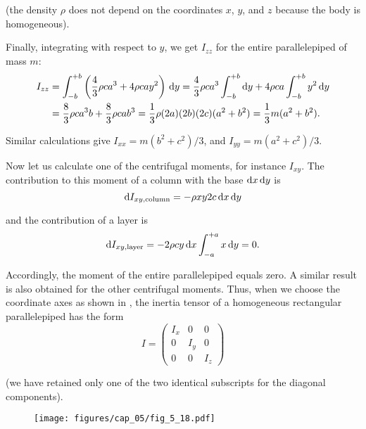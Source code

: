 \noindent
(the density $\rho$ does not depend on the coordinates $x$, $y$, and $z$ because the body is homogeneous).

Finally, integrating  with respect to $y$, we get $I_{zz}$ for the entire parallelepiped of mass $m$:
\begin{align*}
I_{zz} &= \int_{-b}^{+b} \left(\frac{4}{3}\rho ca^3+4\rho cay^2\right)\,\mathrm{d} y = \frac{4}{3}\rho ca^3 \int_{-b}^{+b}\mathrm{d} y + 4\rho ca \int_{-b}^{+b} y^2 \,\mathrm{d} y\\
&= \frac{8}{3}\rho ca^3b + \frac{8}{3}\rho cab^3 = \frac{1}{3} \rho (2a)(2b)(2c)(a^2+b^2) = \frac{1}{3}m(a^2+b^2).
\end{align*}

\noindent
Similar calculations give $I_{xx}=m(b^2+c^2)/3$, and $I_{yy}=m(a^2+c^2)/3$.

Now let us calculate one of the centrifugal moments, for instance $I_{xy}$. The contribution to this moment of a column with the base $\mathrm{d} x\,\mathrm{d} y$ is
\begin{equation*}
\mathrm{d} I_{xy,\text{column}} = -\rho xy2c\,\mathrm{d} x\,\mathrm{d} y
\end{equation*}

\noindent
and the contribution of a layer is
\begin{equation*}
\mathrm{d} I_{xy,\text{layer}} = -2\rho cy\,\mathrm{d} x \int_{-a}^{+a}x\,\mathrm{d} y = 0.
\end{equation*}

\noindent
Accordingly, the moment of the entire parallelepiped equals zero. A similar result is also obtained for the other centrifugal moments. Thus, when we choose the coordinate axes as shown in , the inertia tensor of a homogeneous rectangular parallelepiped has the form
\begin{equation}\label{eq:5_43}
	I = \begin{pmatrix}
		I_x&0&0\\
		0&I_y&0\\
		0&0&I_z
	\end{pmatrix}
\end{equation}

\noindent
(we have retained only one of the two identical subscripts for the diagonal components).

\begin{figure}[t]
	\begin{center}
		\texttt{[image: figures/cap\_05/fig\_5\_18.pdf]}
		\caption[]{}
		\label{fig:5_18}
	\end{center}
	\vspace{-0.9cm}
\end{figure}

